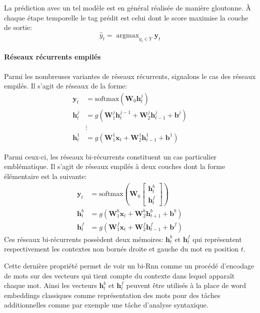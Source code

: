 \documentclass[11pt,openany]{book}
\begin{document}
La prédiction avec un tel modèle est en général réalisée de manière
gloutonne. \`A chaque étape temporelle le tag prédit est celui dont le
score maximise la couche de sortie:
\begin{displaymath}
\hat{y}_t  = \mathop{\text{argmax}}_{y_t \in Y} \mathbf{y}_t
\end{displaymath}


\paragraph{Réseaux récurrents empilés}
Parmi les nombreuses variantes de réseaux récurrents, signalons le cas des
réseaux empilés. Il s'agit de réseaux de la forme: 
\begin{align*}
\mathbf{y}_t &= \text{softmax}(\mathbf{W}_0 \mathbf{h}^j_t)\\
\mathbf{h}^j_t &= g(\mathbf{W}^j_1\mathbf{h}^{j-1}_t + \mathbf{W}^j_2 \mathbf{h}^j_{t-1}+\mathbf{b}^j )\\
& \vdots\\
\mathbf{h}^1_t &= g(\mathbf{W}^1_1\mathbf{x}_t + \mathbf{W}^1_2 \mathbf{h}^1_{t-1}+\mathbf{b}^1 )
\end{align*}

Parmi ceux-ci, les réseaux bi-récurrents constituent un cas particulier emblématique. Il
s'agit de réseaux empilés à deux couches dont la forme élémentaire est
la suivante:
\begin{align*}
\mathbf{y}_t &= \text{softmax}(\mathbf{W}_0 \left[ \begin{array}{c}\mathbf{h}^b_t \\\mathbf{h}^f_t \end{array}\right])\\
\mathbf{h}^b_t &= g(\mathbf{W}^b_1\mathbf{x}_t + \mathbf{W}^b_2 \mathbf{h}^b_{t+1}+\mathbf{b}^b )\\
\mathbf{h}^f_t &= g(\mathbf{W}^f_1\mathbf{x}_t + \mathbf{W}^f_2 \mathbf{h}^f_{t-1}+\mathbf{b}^f )
\end{align*}
Ces réseaux bi-récurrents possèdent deux mémoires: $\mathbf{h}^b_t$ et
$\mathbf{h}^f_t$ qui représentent respectivement les contextes non
bornés droite et gauche du mot en position $t$. 

Cette dernière propriété permet de voir un bi-{\sc Rnn} comme un procédé
d'encodage de mots sur des vecteurs qui tient compte
du contexte dans lequel apparaît chaque mot.
Ainsi les vecteurs $\mathbf{h}^b_t$ et $\mathbf{h}^f_t$
peuvent être utilisés à la place de word embeddings classiques comme représentation des mots pour des tâches
additionnelles comme par exemple une tâche d'analyse syntaxique.  
\end{document}
